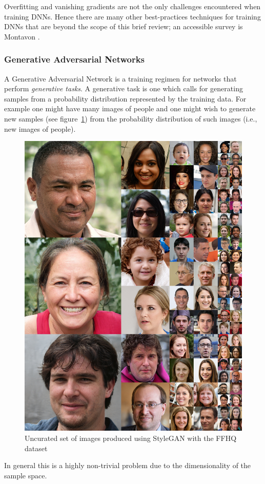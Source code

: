 Overfitting and vanishing gradients are not the only challenges encountered when training DNNs.
%
Hence there are many other best-practices techniques for training DNNs that are beyond the scope of this brief review; an accessible survey is Montavon \etal\cite{montavon2012neural}.
\subsubsection{Generative Adversarial Networks}
A Generative Adversarial Network\cite{goodfellow2014generative} is a training regimen for networks that perform \textit{generative tasks}.
%
A generative task is one which calls for generating samples from a probability distribution represented by the training data.
%
For example one might have many images of people and one might wish to generate new samples (see figure~\ref{fig:stylegan}) from the probability distribution of such images (i.e., new images of people).
\begin{figure}
    \centering
    \begin{adjustbox}{width=.8\linewidth}
        \centering
        \includegraphics[]{figures/neural_networks/stylegan.jpg}
    \end{adjustbox}
    \caption{Uncurated set of images produced using StyleGAN with the FFHQ dataset\cite{karras2018stylebased}}\label{fig:stylegan}
\end{figure}
%
In general this is a highly non-trivial problem due to the dimensionality of the sample space.

